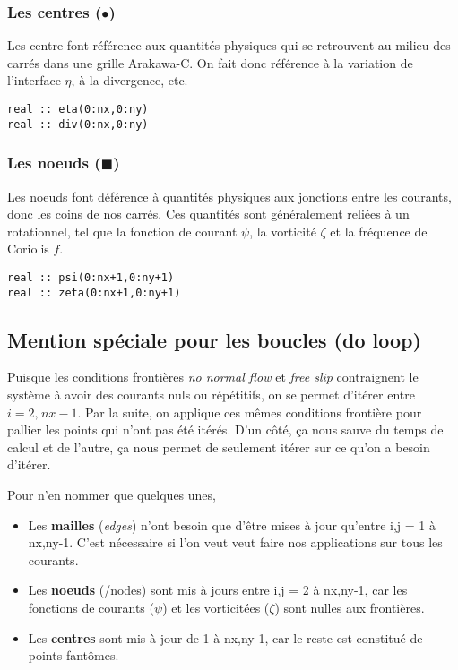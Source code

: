\documentclass[10pt]{article}
\numberwithin{equation}{section}
\newcommand{\pt}{\hspace{1pt}}
\begin{document}
\subsubsection{Les centres (\(\bullet\))}
\label{sec:org0d6ed4a}
Les centre font référence aux quantités physiques qui se retrouvent au milieu des carrés dans une grille Arakawa-C.
On fait donc référence à la variation de l'interface \(\eta\), à la divergence, etc.
\begin{verbatim}
real :: eta(0:nx,0:ny)
real :: div(0:nx,0:ny)
\end{verbatim}


\subsubsection{Les noeuds (\(\blacksquare\))}
\label{sec:orgedf5251}
Les noeuds font déférence à quantités physiques aux jonctions entre les courants, donc les coins de nos carrés.
Ces quantités sont généralement reliées à un rotationnel, tel que la fonction de courant \(\psi\), la vorticité \(\zeta\) et la fréquence de Coriolis \(f\).
\begin{verbatim}
real :: psi(0:nx+1,0:ny+1)
real :: zeta(0:nx+1,0:ny+1)
\end{verbatim}

\subsection{Mention spéciale pour les boucles (do loop)}
\label{sec:orge64d54a}

Puisque les conditions frontières \emph{no normal flow} et \emph{free slip} contraignent le système à avoir des courants nuls ou répétitifs, on se permet d'itérer entre \(i=2,\pt nx-1\).
Par la suite, on applique ces mêmes conditions frontière pour pallier les points qui n'ont pas été itérés.
D'un côté, ça nous sauve du temps de calcul et de l'autre, ça nous permet de seulement itérer sur ce qu'on a besoin d'itérer.\bigskip

Pour n'en nommer que quelques unes,
\begin{itemize}
\item Les \textbf{mailles} (\emph{edges}) n'ont besoin que d'être mises à jour qu'entre i,\pt j = 1 à nx,\pt ny-1.
C'est nécessaire si l'on veut veut faire nos applications sur tous les courants.
\item Les \textbf{noeuds} (/nodes) sont mis à jours entre i,\pt j = 2 à nx,\pt ny-1, car les fonctions de courants (\(\psi\)) et les vorticitées (\(\zeta\)) sont nulles aux frontières.
\item Les \textbf{centres} sont mis à jour de 1 à nx,\pt ny-1, car le reste est constitué de points fantômes.
\end{itemize}
\end{document}
